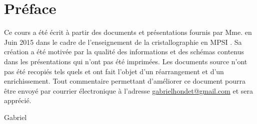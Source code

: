 \chapter{Préface}
Ce cours a été écrit à partir des documents et présentations fournis par Mme.
en Juin 2015 dans le cadre de l’enseignement de la cristallographie en MPSI . Sa création
a été motivée par la qualité des informations et des schémas contenus dans les
présentations qui n’ont pas été imprimées. Les documents source n’ont pas été recopiés
tels quels et ont fait l’objet d’un réarrangement et d’un enrichissement. Tout
commentaire permettant d’améliorer ce document pourra être envoyé par courrier électronique
à l’adresse \url{gabrielhondet@gmail.com} et sera apprécié.

\hfill Gabriel 
